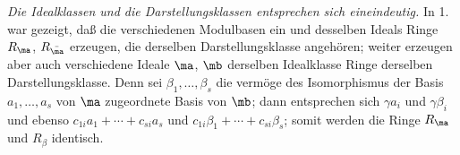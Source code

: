 \emph{Die Idealklassen und die Darstellungsklassen entsprechen sich eineindeutig.} In 1. war gezeigt, daß die verschiedenen Modulbasen ein und desselben Ideals Ringe $R_\ma$, $R_{\bar\ma}$ erzeugen, die derselben Darstellungsklasse angehören; weiter erzeugen aber auch verschiedene Ideale $\ma$, $\mb$ derselben Idealklasse Ringe derselben Darstellungsklasse. Denn sei $\beta_1,\ldots,\beta_s$ die vermöge des Isomorphismus der Basis $a_1,\ldots,a_s$ von $\ma$ zugeordnete Basis von $\mb$; dann entsprechen sich $\gamma a_i$ und $\gamma\beta_i$ und ebenso $c_{1i}a_1+\cdots+c_{si}a_s$ und $c_{1i}\beta_1+\cdots+c_{si}\beta_s$; somit werden die Ringe $R_\ma$ und $R_\beta$ identisch.